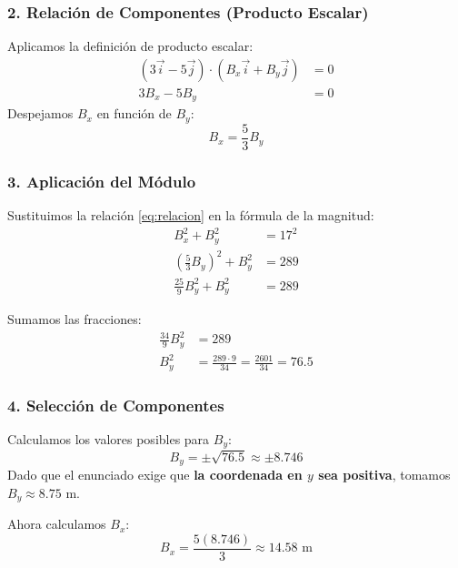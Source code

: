 \documentclass[12pt, a4paper]{article}
\begin{document}
\subsubsection*{2. Relación de Componentes (Producto Escalar)}
Aplicamos la definición de producto escalar:
\begin{align*}
    (3\vec{i} - 5\vec{j}) \cdot (B_x\vec{i} + B_y\vec{j}) &= 0 \\
    3B_x - 5B_y &= 0
\end{align*}
Despejamos $B_x$ en función de $B_y$:
\begin{equation} \label{eq:relacion}
    B_x = \frac{5}{3}B_y
\end{equation}

\subsubsection*{3. Aplicación del Módulo}
Sustituimos la relación \eqref{eq:relacion} en la fórmula de la magnitud:
\begin{align*}
    B_x^2 + B_y^2 &= 17^2 \\
    \left( \frac{5}{3}B_y \right)^2 + B_y^2 &= 289 \\
    \frac{25}{9}B_y^2 + B_y^2 &= 289
\end{align*}

Sumamos las fracciones:
\begin{align*}
    \frac{34}{9}B_y^2 &= 289 \\
    B_y^2 &= \frac{289 \cdot 9}{34} = \frac{2601}{34} = 76.5
\end{align*}

\subsubsection*{4. Selección de Componentes}
Calculamos los valores posibles para $B_y$:
\begin{equation*}
    B_y = \pm \sqrt{76.5} \approx \pm 8.746
\end{equation*}
Dado que el enunciado exige que \textbf{la coordenada en $y$ sea positiva}, tomamos $B_y \approx 8.75$ m.

Ahora calculamos $B_x$:
\begin{equation*}
    B_x = \frac{5(8.746)}{3} \approx 14.58 \text{ m}
\end{equation*}
\end{document}
